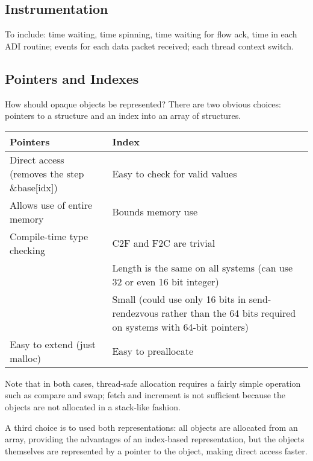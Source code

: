\documentclass{article}
\begin{document}
\subsection{Instrumentation}
To include: time waiting, time spinning, time waiting for flow ack, time in
each ADI routine; events for each data packet received; each thread context
switch. 

\subsection{Pointers and Indexes}
How should opaque objects be represented?  There are two obvious choices:
pointers to a structure and an index into an array of structures.  

\begin{center}
\begin{tabular}{p{2.5in}p{2.5in}}
Pointers&Index\\\hline
Direct access (removes the step \&base[idx])&Easy to check for valid values\\
Allows use of entire memory&Bounds memory use\\
Compile-time type checking&C2F and F2C are trivial\\
&Length is the same on all systems (can use 32 or even 16 bit integer)\\
&Small (could use only 16 bits in send-rendezvous rather than the 64 bits
required on systems with 64-bit pointers)\\
Easy to extend (just malloc)&Easy to preallocate\\
\end{tabular}
\end{center}
Note that in both cases, thread-safe allocation requires a fairly simple
operation such as compare and swap; fetch and increment is not sufficient
because the objects are not allocated in a stack-like fashion.

A third choice is to used both representations:  all objects are allocated
from an array, providing the advantages of an index-based representation, but
the objects themselves are represented by a pointer to the object, making
direct access faster.



\end{document}
